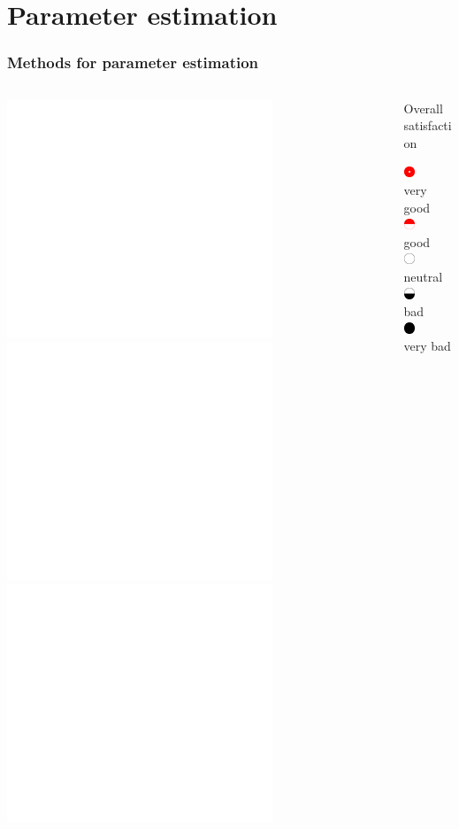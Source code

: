 \documentclass[ 10pt]{beamer}
\begin{document}
\section{Parameter estimation}
\frame
{
\frametitle{Methods for parameter estimation}
\begin{columns}[]
\begin{column}[T]{0.6\textwidth}
\includegraphics<1>[height=2.8in]{mck-final-bare.pdf}
\includegraphics<2>[height=2.8in]{mck-final.pdf}
\includegraphics<3->[height=2.8in]{mck-final-overlay.pdf}
\end{column}
\begin{column}[t]{0.4\textwidth}
{\small
Overall satisfaction

\vspace{1mm}
\includegraphics[height=0.13in]{CR5.pdf} $\quad$ very good\\
\vspace{1mm}
\includegraphics[height=0.13in]{CR4.pdf} $\quad$ good\\
\vspace{1mm}
\includegraphics[height=0.13in]{CR3.pdf} $\quad$ neutral\\
\vspace{1mm}
\includegraphics[height=0.13in]{CR2.pdf} $\quad$ bad\\
\vspace{1mm}
\includegraphics[height=0.13in]{CR1.pdf} $\quad$ very bad\\
\vspace{1mm}

}

\end{column}
\end{columns}}
\end{document}
